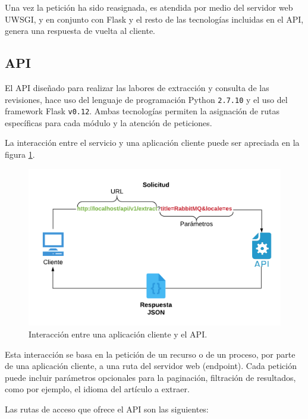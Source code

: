 Una vez la petición ha sido reasignada, es atendida por medio del servidor web UWSGI, y en conjunto
con Flask y el resto de las tecnologías incluidas en el API, genera una respuesta de vuelta al cliente.

\subsection{API}

El API diseñado para realizar las labores de extracción y consulta de las revisiones, hace uso del lenguaje de programación Python \texttt{2.7.10} y el uso del framework Flask \texttt{v0.12}.
Ambas tecnologías permiten la asignación de rutas específicas para cada módulo
y la atención de peticiones.

La interacción entre el servicio y una aplicación cliente puede ser apreciada en la figura \ref{fig:diagram_api_1}.

\begin{figure}[H]
	\centering
		\includegraphics[width=1\textwidth]{figures/diagram_api_1}
	\caption{Interacción entre una aplicación cliente y el API.}
	\label{fig:diagram_api_1}
\end{figure}

Esta interacción se basa en la petición de un recurso o de un proceso, por parte de una aplicación cliente, a una ruta del servidor web (endpoint).
Cada petición puede incluir parámetros opcionales para la paginación, filtración de resultados, como por ejemplo, el idioma del artículo a extraer.

Las rutas de acceso que ofrece el API son las siguientes:

